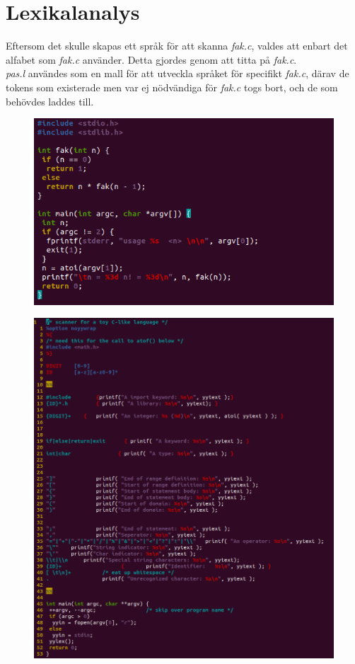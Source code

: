 \section{Lexikalanalys}

Eftersom det skulle skapas ett språk för att skanna \textit{fak.c}, valdes att enbart det alfabet
som \textit{fak.c} använder. Detta gjordes genom att titta på \textit{fak.c}.
\\ \textit{pas.l} användes som en mall för att utveckla språket för specifikt \textit{fak.c},
därav de tokens som existerade men var ej nödvändiga för \textit{fak.c} togs bort, och de som
behövdes laddes till. 

\begin{figure}[!h]
    \includegraphics[width=\linewidth]{bilder/fak_c.png}
    \label{fig:fak c}
\end{figure}


\begin{figure}[!h]
    \includegraphics[width=\linewidth]{bilder/fak_l.png}
    \label{fig:fak l}
\end{figure}


